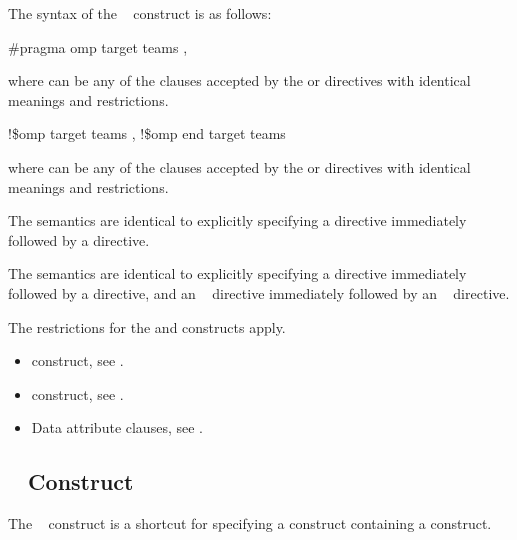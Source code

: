 \syntax
The syntax of the ~ construct is as follows:

\ccppspecificstart
\begin{boxedcode}
\#pragma omp target teams \plc{[clause[ [},\plc{] clause] ... ]}
\end{boxedcode}

where  can be any of the clauses accepted by the  or  directives 
with identical meanings and restrictions.
\ccppspecificend

\fortranspecificstart
\begin{boxedcode}
!\$omp target teams \plc{[clause[ [},\plc{] clause] ... ]}
!\$omp end target teams
\end{boxedcode}

where  can be any of the clauses accepted by the  or  directives 
with identical meanings and restrictions.
\fortranspecificend

\descr
\ccppspecificstart
The semantics are identical to explicitly specifying a  directive immediately 
followed by a  directive.
\ccppspecificend

\fortranspecificstart
The semantics are identical to explicitly specifying a  directive immediately 
followed by a  directive, and an ~ directive immediately followed by 
an ~ directive.
\fortranspecificend

\restrictions
The restrictions for the  and  constructs apply.

\crossreferences
\begin{itemize}
\item {} construct, see 
.

\item {} construct, see 
.

\item Data attribute clauses, see 
.
\end{itemize}









\subsection{~ Construct}
\label{subsec:teams distribute Construct}
\summary
The ~ construct is a shortcut for specifying a  construct 
containing a  construct.

